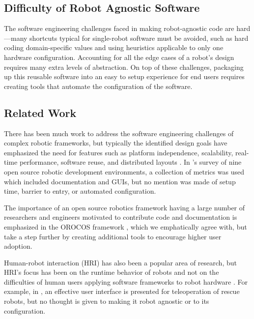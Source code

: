 \documentclass[10pt,journal,compsoc]{joser1}
\begin{document}
{\subsection{Difficulty of Robot Agnostic Software}

The software engineering challenges faced in making robot-agnostic code are hard---many shortcuts typical for single-robot software must be avoided, such as hard coding domain-specific values and using heuristics applicable to only one hardware configuration. Accounting for all the edge cases of a robot's design requires many extra levels of abstraction. On top of these challenges, packaging up this reusable software into an easy to setup experience for end users requires creating tools that automate the configuration of the software.

\subsection{Related Work}

There has been much work to address the software engineering challenges of complex robotic frameworks, but typically the identified design goals have emphasized the need for features such as platform independence, scalability, real-time performance, software reuse, and distributed layouts \cite{realtime_framework, collett2005player, kramer2007development}. In \cite{kramer2007development}'s survey of nine open source robotic development environments, a collection of metrics was used which included documentation and GUIs, but no mention was made of setup time, barrier to entry, or automated configuration.

The importance of an open source robotics framework having a large number of researchers and engineers motivated to contribute code and documentation is emphasized in the OROCOS framework \cite{bruyninckx2001open}, which we emphatically agree with, but take a step further by creating additional tools to encourage higher user adoption.
  
Human-robot interaction (HRI) has also been a popular area of research, but HRI's focus has been on the runtime behavior of robots and not on the difficulties of human users applying software frameworks to robot hardware \cite{hci_metrics, yancotaxonomy, goodrichseven}. For example, in \cite{rescueRobots}, an effective user interface is presented for teleoperation of rescue robots, but no thought is given to making it robot agnostic or to its configuration. 

}
\end{document}
